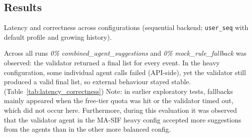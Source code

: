 \documentclass[openany]{book}
\begin{document}
\subsection*{Results}
\begin{table}[h]
\centering
\caption{Latency and correctness across configurations (sequential backend; \texttt{user\_seq} with default profile and growing history).}
\setlength{\tabcolsep}{4pt}
\small
{}
\label{tab:latency_correctness}
\caption*{\textit{Legend.} WS p50/p90/max: WebSocket round-trip latency percentiles and maximum (ms). Suite p50/p90/max: end-to-end latency percentiles and maximum for the deterministic event suite (ms). Schema-valid: share of responses that passed JSON schema validation (\%). \textit{n}: number of events.}
\end{table}

Across all runs \emph{0\% combined\_agent\_suggestions} and \emph{0\% mock\_rule\_fallback} was observed: the validator returned a final list for every event. In the heavy configuration, some individual agent calls failed (API-side), yet the validator still produced a valid final list, so external behaviour stayed stable. (Table~\ref{tab:latency_correctness})
Note: in earlier exploratory tests, fallbacks mainly appeared when the free-tier quota was hit or the validator timed out, which did not occur here. Furthermore, during this evaluation it was observed that the validator agent in the MA-SIF heavy config accepted more suggestions from the agents than in the other more balanced config.
\end{document}
